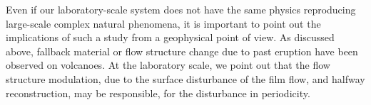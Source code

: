 \documentclass[aps,pre,preprint,groupedaddress,showkeys]{revtex4-2}
\begin{document}
Even if our laboratory-scale system does not have the same physics reproducing large-scale complex natural phenomena, it is important to point out the implications of such a study from a geophysical point of view.
As discussed above, fallback material or flow structure change due to past eruption have been observed on volcanoes. 
At the laboratory scale, we point out that the flow structure modulation, due to the surface disturbance of the film flow, and halfway reconstruction, may be responsible, for the disturbance in periodicity.

%


\end{document}
